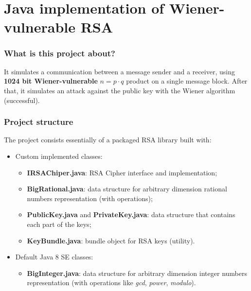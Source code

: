 \documentclass{beamer}
\begin{document}
\section{Java implementation of Wiener-vulnerable RSA}

  \frame{\sectionpage}
  
  \begin{frame}
  \frametitle{What is this project about?}
    It simulates a communication between a message sender and a receiver, using \textbf{1024 bit Wiener-vulnerable} $n = p \cdot q$ product on a single message block. After that, it simulates an attack against the public key with the Wiener algorithm (successful).
  \end{frame}
  
    \begin{frame}
    \frametitle{Project structure}
    
    The project consists essentially of a packaged RSA library built with:
    
    \begin{itemize}
    	\item Custom implemented classes:
    	\begin{itemize}
    		\item \textbf{IRSAChiper.java}: RSA Cipher interface and implementation;
    		\item \textbf{BigRational.java}: data structure for arbitrary dimension rational numbers representation (with operations);
    		\item \textbf{PublicKey.java} and \textbf{PrivateKey.java}: data structure that contains each part of the keys; 
    		\item \textbf{KeyBundle.java}: bundle object for RSA keys (utility).
    	\end{itemize}
    	\item Default Java 8 SE classes:
    		\begin{itemize}
    			\item \textbf{BigInteger.java}: data structure for arbitrary dimension integer numbers representation (with operations like \textit{gcd}, \textit{power}, \textit{modulo}).
    		\end{itemize}
    	\end{itemize}
    
    
    
    
  
  \end{frame}
  
\end{document}
